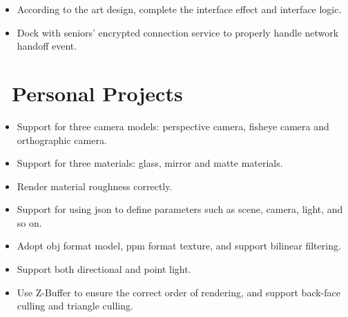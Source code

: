\documentclass{resume}
\begin{document}
\begin{itemize}
  \item According to the art design, complete the interface effect and interface logic.
  \item Dock with seniors' encrypted connection service to properly handle network handoff event.
\end{itemize}


\section{\texorpdfstring{\faGithubAlt\ Personal Projects}{Personal Projects}}
\begin{itemize}
  \item Support for three camera models: perspective camera, fisheye camera and orthographic camera.
  \item Support for three materials: glass, mirror and matte materials.
  \item Render material roughness correctly.
\end{itemize}

\begin{itemize}
  \item Support for using json to define parameters such as scene, camera, light, and so on.
  \item Adopt obj format model, ppm format texture, and support bilinear filtering.
  \item Support both directional and point light.
  \item Use Z-Buffer to ensure the correct order of rendering, and support back-face culling and triangle culling.
\end{itemize}
\end{document}
